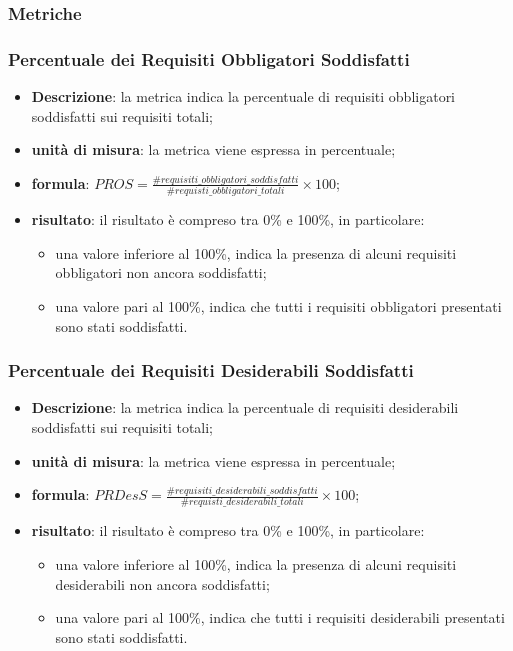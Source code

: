\subsubsection{Metriche}
		\subsubsection*{Percentuale dei Requisiti Obbligatori Soddisfatti}
			\begin{itemize}
				\item{\textbf{Descrizione}}: la metrica indica la percentuale di requisiti obbligatori soddisfatti sui requisiti totali;
				\item{\textbf{unità di misura}}: la metrica viene espressa in percentuale;
				\item{\textbf{formula}}: $ PROS = \displaystyle\frac{\#requisiti\_obbligatori\_soddisfatti}{\#requisti\_obbligatori\_totali}\times100$;
				\item{\textbf{risultato}}: il risultato è compreso tra 0\% e 100\%, in particolare:
					\begin{itemize}
						\item una valore inferiore al 100\%, indica la presenza di alcuni requisiti obbligatori non ancora soddisfatti;
						\item una valore pari al 100\%, indica che tutti i requisiti obbligatori presentati sono stati soddisfatti.
					\end{itemize}
			\end{itemize}

		\subsubsection*{Percentuale dei Requisiti Desiderabili Soddisfatti}
			\begin{itemize}
				\item{\textbf{Descrizione}}: la metrica indica la percentuale di requisiti desiderabili soddisfatti sui requisiti totali;
				\item{\textbf{unità di misura}}: la metrica viene espressa in percentuale;
				\item{\textbf{formula}}: $ PRDesS = \displaystyle\frac{\#requisiti\_desiderabili\_soddisfatti}{\#requisti\_desiderabili\_totali}\times100$;
				\item{\textbf{risultato}}: il risultato è compreso tra 0\% e 100\%, in particolare:
				\begin{itemize}
					\item una valore inferiore al 100\%, indica la presenza di alcuni requisiti desiderabili non ancora soddisfatti;
					\item una valore pari al 100\%, indica che tutti i requisiti desiderabili presentati sono stati soddisfatti.
				\end{itemize}
			\end{itemize}

